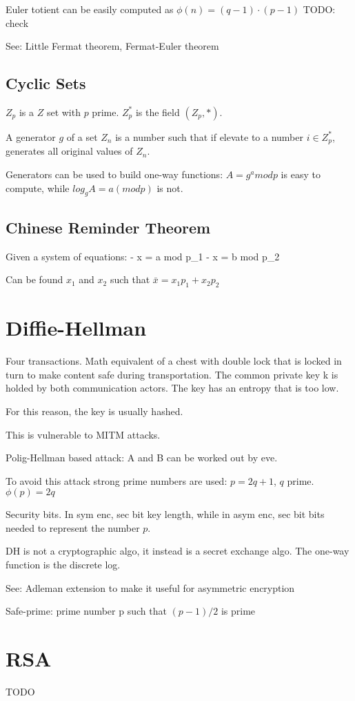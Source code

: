 Euler totient can be easily computed as $\phi(n) = (q-1) \cdot (p-1)$ TODO: check

See: Little Fermat theorem, Fermat-Euler theorem

\subsection{Cyclic Sets}
$Z_p$ is a $Z$ set with $p$ prime. $Z_p^*$ is the field $(Z_p, *)$.

A generator $g$ of a set $Z_n$ is a number such that if elevate to a number $i \in Z_p^*$, generates all original values of $Z_n$.

Generators can be used to build one-way functions: $A = g^a mod p$ is easy to compute, while $log_g A = a (mod p)$ is not.

\subsection{Chinese Reminder Theorem}
Given a system of equations:
 - x = a mod p_1
 - x = b mod p_2

Can be found $x_1$ and $x_2$ such that $\bar x = x_1 p_1 + x_2 p_2$

\section{Diffie-Hellman}
Four transactions. Math equivalent of a chest with double lock that is locked in turn to make content safe during transportation.
The common private key k is holded by both communication actors. The key has an entropy that is too low.

For this reason, the key is usually hashed.

This is vulnerable to MITM attacks.

Polig-Hellman based attack: A and B can be worked out by eve.

To avoid this attack strong prime numbers are used: $p = 2q+1$, $q$ prime. $\phi(p) = 2q$

Security bits. In sym enc, sec bit \approx key length, while in asym enc, sec bit \approx bits needed to represent the number $p$.

DH is not a cryptographic algo, it instead is a secret exchange algo.
The one-way function is the discrete log.

See: Adleman extension to make it useful for asymmetric encryption

Safe-prime: prime number p such that $(p-1)/2$ is prime

\section{RSA}
TODO